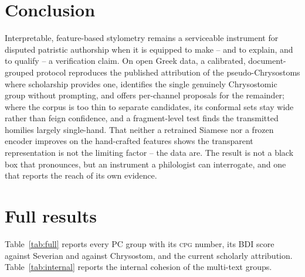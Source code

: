 \documentclass{anthology-ch}
\begin{document}
\section{Conclusion}

Interpretable, feature-based stylometry remains a serviceable instrument for disputed patristic authorship when it is equipped to make -- and to explain, and to qualify -- a verification claim. On open Greek data, a calibrated, document-grouped protocol reproduces the published attribution of the pseudo-Chrysostoms where scholarship provides one, identifies the single genuinely Chrysostomic group without prompting, and offers per-channel proposals for the remainder; where the corpus is too thin to separate candidates, its conformal sets stay wide rather than feign confidence, and a fragment-level test finds the transmitted homilies largely single-hand. That neither a retrained Siamese nor a frozen encoder improves on the hand-crafted features shows the transparent representation is not the limiting factor -- the data are. The result is not a black box that pronounces, but an instrument a philologist can interrogate, and one that reports the reach of its own evidence.

\printbibliography

\appendix

\section{Full results}

Table~\ref{tab:full} reports every PC group with its \textsc{cpg} number, its BDI score against Severian and against Chrysostom, and the current scholarly attribution. Table~\ref{tab:internal} reports the internal cohesion of the multi-text groups.

\begin{table}[h]
  \centering
  \small
  
  \caption{All 22 pseudo-Chrysostom groups: CPG number, BDI scores against Severian and Chrysostom, and current scholarly attribution.}
  \label{tab:full}
\end{table}

\begin{table}[h]
  \centering
  \small
  
  \caption{Internal cohesion of the multi-text PC groups: mean pairwise distance among a group's own texts (lower is tighter). The cross-group baseline is $0.81$.}
  \label{tab:internal}
\end{table}
\end{document}
